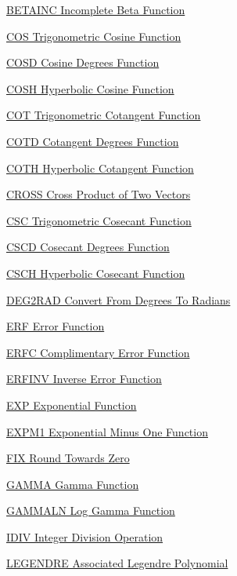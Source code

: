 \begin{DoxyItemize}
\item \hyperlink{mathfunctions_betainc}{B\-E\-T\-A\-I\-N\-C Incomplete Beta Function}  
\item \hyperlink{mathfunctions_cos}{C\-O\-S Trigonometric Cosine Function}  
\item \hyperlink{mathfunctions_cosd}{C\-O\-S\-D Cosine Degrees Function}  
\item \hyperlink{mathfunctions_cosh}{C\-O\-S\-H Hyperbolic Cosine Function}  
\item \hyperlink{mathfunctions_cot}{C\-O\-T Trigonometric Cotangent Function}  
\item \hyperlink{mathfunctions_cotd}{C\-O\-T\-D Cotangent Degrees Function}  
\item \hyperlink{mathfunctions_coth}{C\-O\-T\-H Hyperbolic Cotangent Function}  
\item \hyperlink{mathfunctions_cross}{C\-R\-O\-S\-S Cross Product of Two Vectors}  
\item \hyperlink{mathfunctions_csc}{C\-S\-C Trigonometric Cosecant Function}  
\item \hyperlink{mathfunctions_cscd}{C\-S\-C\-D Cosecant Degrees Function}  
\item \hyperlink{mathfunctions_csch}{C\-S\-C\-H Hyperbolic Cosecant Function}  
\item \hyperlink{mathfunctions_deg2rad}{D\-E\-G2\-R\-A\-D Convert From Degrees To Radians}  
\item \hyperlink{mathfunctions_erf}{E\-R\-F Error Function}  
\item \hyperlink{mathfunctions_erfc}{E\-R\-F\-C Complimentary Error Function}  
\item \hyperlink{mathfunctions_erfinv}{E\-R\-F\-I\-N\-V Inverse Error Function}  
\item \hyperlink{mathfunctions_exp}{E\-X\-P Exponential Function}  
\item \hyperlink{mathfunctions_expm1}{E\-X\-P\-M1 Exponential Minus One Function}  
\item \hyperlink{mathfunctions_fix}{F\-I\-X Round Towards Zero}  
\item \hyperlink{mathfunctions_gamma}{G\-A\-M\-M\-A Gamma Function}  
\item \hyperlink{mathfunctions_gammaln}{G\-A\-M\-M\-A\-L\-N Log Gamma Function}  
\item \hyperlink{mathfunctions_idiv}{I\-D\-I\-V Integer Division Operation}  
\item \hyperlink{mathfunctions_legendre}{L\-E\-G\-E\-N\-D\-R\-E Associated Legendre Polynomial}  

\end{DoxyItemize}
